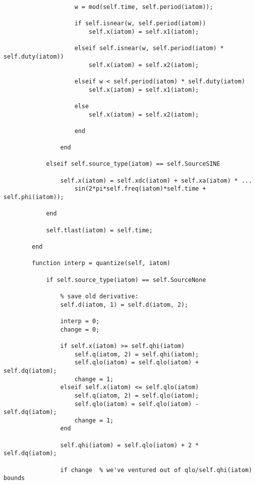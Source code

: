 \begin{lstlisting}
                    w = mod(self.time, self.period(iatom));

                    if self.isnear(w, self.period(iatom))
                        self.x(iatom) = self.x1(iatom);
                        
                    elseif self.isnear(w, self.period(iatom) * self.duty(iatom))
                        self.x(iatom) = self.x2(iatom);
                        
                    elseif w < self.period(iatom) * self.duty(iatom)
                        self.x(iatom) = self.x1(iatom);
                        
                    else
                        self.x(iatom) = self.x2(iatom);
                        
                    end

                end
            
            elseif self.source_type(iatom) == self.SourceSINE
                
                self.x(iatom) = self.xdc(iatom) + self.xa(iatom) * ...
                    sin(2*pi*self.freq(iatom)*self.time + self.phi(iatom));
                
            end
            
            self.tlast(iatom) = self.time;
            
        end
        
        function interp = quantize(self, iatom)  
            
            if self.source_type(iatom) == self.SourceNone
            
                % save old derivative:
                self.d(iatom, 1) = self.d(iatom, 2);

                interp = 0;
                change = 0;

                if self.x(iatom) >= self.qhi(iatom)
                    self.q(iatom, 2) = self.qhi(iatom);
                    self.qlo(iatom) = self.qlo(iatom) + self.dq(iatom);
                    change = 1;
                elseif self.x(iatom) <= self.qlo(iatom)
                    self.q(iatom, 2) = self.qlo(iatom);
                    self.qlo(iatom) = self.qlo(iatom) - self.dq(iatom);
                    change = 1;
                end

                self.qhi(iatom) = self.qlo(iatom) + 2 * self.dq(iatom);

                if change  % we've ventured out of qlo/self.qhi(iatom) bounds


\end{lstlisting}
